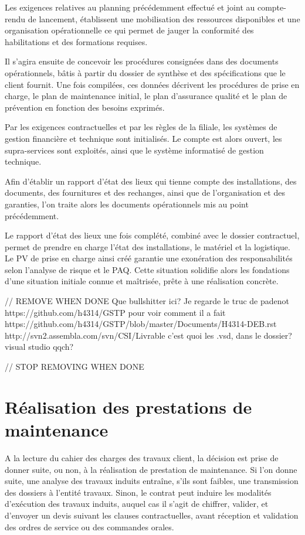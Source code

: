 Les exigences relatives au planning précédemment effectué et joint au compte-rendu de lancement, établissent une mobilisation des ressources disponibles et une organisation opérationnelle ce qui permet de  jauger la conformité des habilitations et  des formations requises.

Il s’agira ensuite de concevoir les procédures consignées dans des documents opérationnels, bâtis à partir du dossier de synthèse et des spécifications que le client fournit. Une fois compilées, ces données décrivent les procédures de prise en charge, le plan de maintenance initial, le plan d’assurance qualité et le plan de prévention en fonction des besoins exprimés.

Par les exigences contractuelles et par les règles de la filiale, les systèmes de gestion financière et technique sont initialisés. Le compte est alors ouvert, les supra-services sont exploités, ainsi que le système informatisé de gestion technique.

Afin d’établir un rapport d’état des lieux qui tienne compte des installations, des documents, des fournitures et des rechanges, ainsi que de l’organisation et des garanties, l’on traite alors les documents opérationnels mis au point précédemment.

Le rapport d’état des lieux une fois complété, combiné avec le dossier contractuel, permet de prendre en charge l’état des installations, le matériel et la logistique. Le PV de prise en charge ainsi créé garantie une exonération des responsabilités selon l’analyse de risque et le PAQ. Cette situation solidifie alors les fondations d’une situation initiale connue et maîtrisée, prête à une réalisation concrète.

// REMOVE WHEN DONE
Que bullshitter ici?
Je regarde le truc de padenot https://github.com/h4314/GSTP
pour voir comment il a fait https://github.com/h4314/GSTP/blob/master/Documents/H4314-DEB.rst
http://svn2.assembla.com/svn/CSI/Livrable%
c’est quoi les .vsd, dans le dossier? visual studio qqch? 

// STOP REMOVING WHEN DONE

\section{Réalisation des prestations de maintenance}

A la lecture du cahier des charges des travaux client, la décision est prise de donner suite, ou non, à la réalisation de prestation de maintenance. Si l’on donne suite, une analyse des travaux induits entraîne, s’ils sont faibles, une transmission des dossiers à l’entité travaux. Sinon, le contrat peut induire les modalités d’exécution des travaux induits, auquel cas il s’agit de chiffrer, valider, et d’envoyer un devis suivant les clauses contractuelles, avant réception et validation des ordres de service ou des commandes orales.

